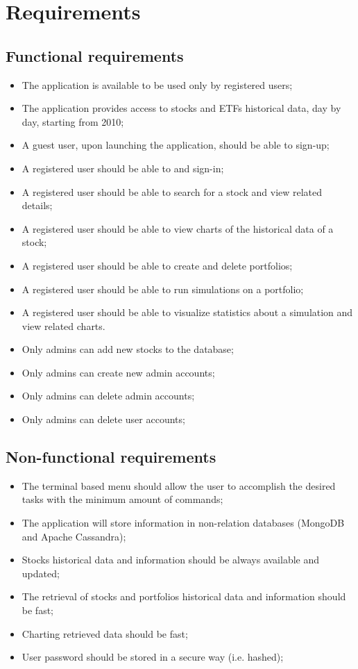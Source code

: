 \section{Requirements}
\subsection{Functional requirements}
\begin{itemize}
    \item The application is available to be used only by registered users;
    \item The application provides access to stocks and ETFs historical data, day by day, starting from 2010;\\
	\item A guest user, upon launching the application, should be able to sign-up;
	\item A registered user should be able to and sign-in;
	\item A registered user should be able to search for a stock and view related details;
	\item A registered user should be able to view charts of the historical data of a stock;
	\item A registered user should be able to create and delete portfolios;
	\item A registered user should be able to run simulations on a portfolio;
	\item A registered user should be able to visualize statistics about a simulation and view related charts.\\
	\item Only admins can add new stocks to the database;
	\item Only admins can create new admin accounts;
	\item Only admins can delete admin accounts;
	\item Only admins can delete user accounts;
\end{itemize}
\subsection{Non-functional requirements}
\begin{itemize}
    \item The terminal based menu should allow the user to accomplish the desired tasks with the minimum amount of commands;
    \item The application will store information in non-relation databases (MongoDB and Apache Cassandra);
    \item Stocks historical data and information should be always available and updated;
	\item The retrieval of stocks and portfolios historical data and information should be fast;
	\item Charting retrieved data should be fast;
	\item User password should be stored in a secure way (i.e. hashed);
\end{itemize}
